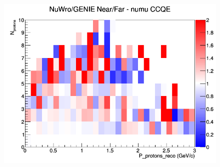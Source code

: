 \begin{figure}[h]
\endminipage
{}
\includegraphics[width=\linewidth]{eff_N_P/LAr/protons/ratios/CCQE_NuWro_GENIE_numu_NF_N_P.png}
\endminipage
\newline
\end{figure}
\clearpage
